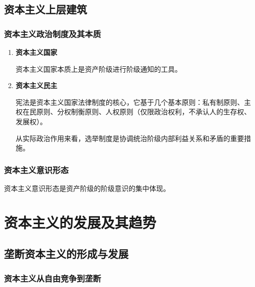 \documentclass[12pt, a4paper, oneside]{ctexart}
\begin{document}
\subsection{资本主义上层建筑}

\subsubsection{资本主义政治制度及其本质}

\begin{enumerate}
  \item {\bf 资本主义国家}
  
  资本主义国家本质上是资产阶级进行阶级通知的工具。

  \item {\bf 资本主义民主}
  
  宪法是资本主义国家法律制度的核心，它基于几个基本原则：私有制原则、主权在民原则、分权制衡原则、人权原则（仅限政治权利，不承认人的生存权、发展权）。

  从实际政治作用来看，选举制度是协调统治阶级内部利益关系和矛盾的重要措施。

\end{enumerate}

\subsubsection{资本主义意识形态}

资本主义意识形态是资产阶级的阶级意识的集中体现。

\section{资本主义的发展及其趋势}

\subsection{垄断资本主义的形成与发展}

\subsubsection{资本主义从自由竞争到垄断}
\end{document}
